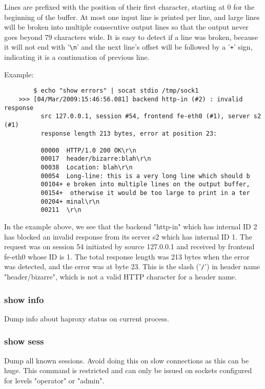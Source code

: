   Lines are prefixed with the position of their first character, starting at 0
  for the beginning of the buffer. At most one input line is printed per line,
  and large lines will be broken into multiple consecutive output lines so that
  the output never goes beyond 79 characters wide. It is easy to detect if a
  line was broken, because it will not end with '\verb|\n|' and the next line's offset
  will be followed by a '\verb|+|' sign, indicating it is a continuation of previous
  line.

  Example:
  \begin{verbatim}
        $ echo "show errors" | socat stdio /tmp/sock1
    >>> [04/Mar/2009:15:46:56.081] backend http-in (#2) : invalid response
          src 127.0.0.1, session #54, frontend fe-eth0 (#1), server s2 (#1)
          response length 213 bytes, error at position 23:

          00000  HTTP/1.0 200 OK\r\n
          00017  header/bizarre:blah\r\n
          00038  Location: blah\r\n
          00054  Long-line: this is a very long line which should b
          00104+ e broken into multiple lines on the output buffer,
          00154+  otherwise it would be too large to print in a ter
          00204+ minal\r\n
          00211  \r\n
  \end{verbatim}

    In the example above, we see that the backend "http-in" which has internal
    ID 2 has blocked an invalid response from its server s2 which has internal
    ID 1. The request was on session 54 initiated by source 127.0.0.1 and
    received by frontend fe-eth0 whose ID is 1. The total response length was
    213 bytes when the error was detected, and the error was at byte 23. This
    is the slash ('\verb|/|') in header name "header/bizarre", which is not a valid
    HTTP character for a header name.

\subsubsection[show info]{show info}
  Dump info about haproxy status on current process.

\subsubsection[show sess]{show sess}
  Dump all known sessions. Avoid doing this on slow connections as this can
  be huge. This command is restricted and can only be issued on sockets
  configured for levels "operator" or "admin".

